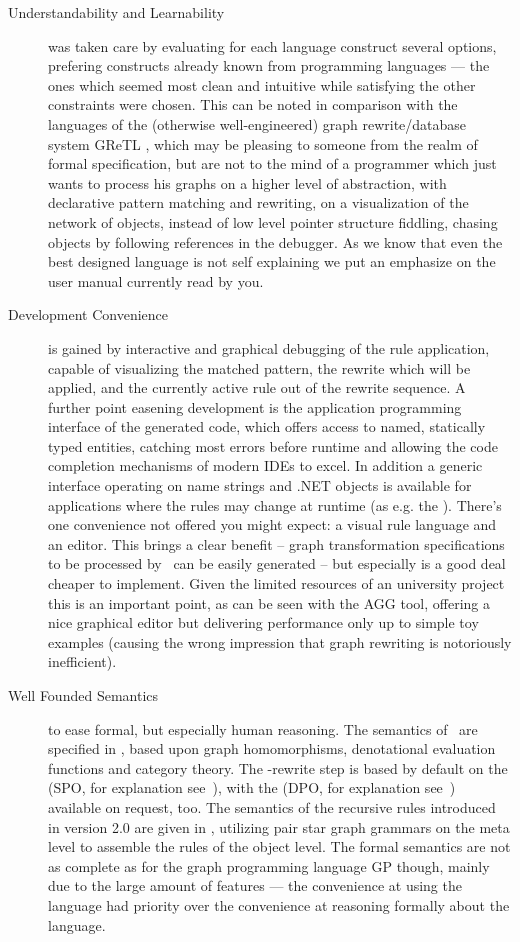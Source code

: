 \begin{description}
\item[Understandability and Learnability]
was taken care by evaluating for each language construct several options,
prefering constructs already known from programming languages ---
the ones which seemed most clean and intuitive while satisfying the other constraints were chosen.
This can be noted in comparison with the languages of the (otherwise well-engineered) graph rewrite/database system GReTL \cite{GReTL},
which may be pleasing to someone from the realm of formal specification, but are not to the mind of a programmer which just wants to process his graphs on a higher level of abstraction, with declarative pattern matching and rewriting, on a visualization of the network of objects, instead of low level pointer structure fiddling, chasing objects by following references in the debugger.
As we know that even the best designed language is not self explaining we put an emphasize on the user manual currently read by you.

\item[Development Convenience]
is gained by interactive and graphical debugging of the rule application, capable of visualizing the matched pattern, the rewrite which will be applied, and the currently active rule out of the rewrite sequence.
A further point easening development is the application programming interface of the generated code,
which offers access to named, statically typed entities, catching most errors before runtime and allowing the code completion mechanisms of modern IDEs to excel.
In addition a generic interface operating on name strings and .NET objects is available for applications where the rules may change at runtime (as e.g. the \GrShell).
There's one convenience not offered you might expect: a visual rule language and an editor.
This brings a clear benefit -- graph transformation specifications to be processed by \GrG\ can be easily generated --
but especially is a good deal cheaper to implement. Given the limited resources of an university project this is an important point,
as can be seen with the AGG\cite{agg} tool, offering a nice graphical editor but delivering performance only up to simple toy examples
(causing the wrong impression that graph rewriting is notoriously inefficient).

\item[Well Founded Semantics]
to ease formal, but especially human reasoning.
The semantics of \GrG\ are specified in \cite{DissRuby}, based upon graph homomorphisms, denotational evaluation functions and category theory.
The \GrG-rewrite step is based by default on the  (SPO, for explanation see~\cite{spoapproach}),
with the  (DPO, for explanation see~\cite{dpoapproach}) available on request, too.
The semantics of the recursive rules introduced in version 2.0 are given in \cite{Jak:08},
utilizing pair star graph grammars on the meta level to assemble the rules of the object level.
The formal semantics are not as complete as for the graph programming language GP\cite{gp} though, mainly due to the large amount of features
--- the convenience at using the language had priority over the convenience at reasoning formally about the language.


\end{description}
